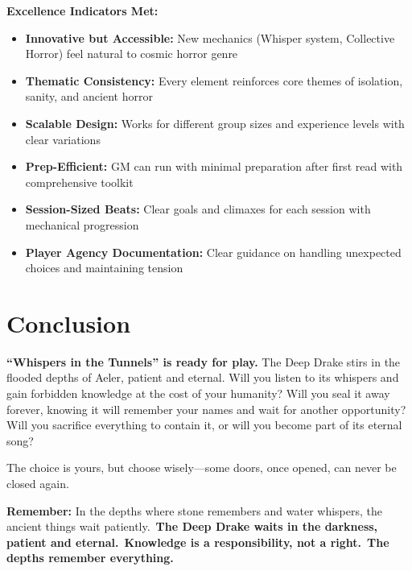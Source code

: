 \documentclass[11pt]{article}
\begin{document}
\textbf{Excellence Indicators Met:} \begin{itemize} \item \checkmark \textbf{Innovative but Accessible:} New mechanics (Whisper system, Collective Horror) feel natural to cosmic horror genre \item \checkmark \textbf{Thematic Consistency:} Every element reinforces core themes of isolation, sanity, and ancient horror \item \checkmark \textbf{Scalable Design:} Works for different group sizes and experience levels with clear variations \item \checkmark \textbf{Prep-Efficient:} GM can run with minimal preparation after first read with comprehensive toolkit \item \checkmark \textbf{Session-Sized Beats:} Clear goals and climaxes for each session with mechanical progression \item \checkmark \textbf{Player Agency Documentation:} Clear guidance on handling unexpected choices and maintaining tension \end{itemize}

\section*{Conclusion}

\textbf{``Whispers in the Tunnels'' is ready for play.} The Deep Drake stirs in the flooded depths of Aeler, patient and eternal. Will you listen to its whispers and gain forbidden knowledge at the cost of your humanity? Will you seal it away forever, knowing it will remember your names and wait for another opportunity? Will you sacrifice everything to contain it, or will you become part of its eternal song?

The choice is yours, but choose wisely---some doors, once opened, can never be closed again.

\begin{center} 

\vspace{1cm}

\textbf{Remember:} In the depths where stone remembers and water whispers, the ancient things wait patiently.\ \textbf{The Deep Drake waits in the darkness, patient and eternal.}\ \textbf{Knowledge is a responsibility, not a right.}\ \textbf{The depths remember everything.} \end{center}
\end{document}
